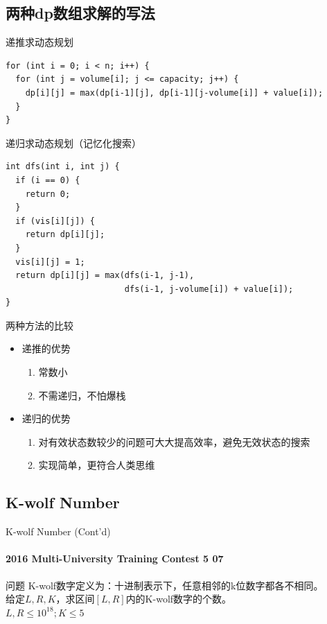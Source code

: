 \documentclass[hyperref={unicode=true}]{beamer}
\theoremstyle{definition}
\theoremstyle{proof}
\begin{document}
\subsection{两种dp数组求解的写法}
\begin{frame}[fragile]{递推求动态规划}
  \begin{verbatim}
for (int i = 0; i < n; i++) {
  for (int j = volume[i]; j <= capacity; j++) {
    dp[i][j] = max(dp[i-1][j], dp[i-1][j-volume[i]] + value[i]);
  }
}
  \end{verbatim}
\end{frame}

\begin{frame}[fragile]{递归求动态规划（记忆化搜索）}
  \begin{verbatim}
int dfs(int i, int j) {
  if (i == 0) {
    return 0;
  }
  if (vis[i][j]) {
    return dp[i][j];
  }
  vis[i][j] = 1;
  return dp[i][j] = max(dfs(i-1, j-1),
                        dfs(i-1, j-volume[i]) + value[i]);
}
  \end{verbatim}
\end{frame}
\begin{frame}{两种方法的比较}
  \begin{itemize}[<+->]
  \item 递推的优势
    \begin{enumerate}
    \item 常数小
    \item 不需递归，不怕爆栈
    \end{enumerate}
  \item 递归的优势
    \begin{enumerate}
    \item 对有效状态数较少的问题可大大提高效率，避免无效状态的搜索
    \item 实现简单，更符合人类思维
    \end{enumerate}
  \end{itemize}
\end{frame}


\subsection{K-wolf Number}
\begin{frame}{K-wolf Number (Cont'd)}\framesubtitle{2016 Multi-University Training Contest 5 07}
  \begin{block}{问题}
    K-wolf数字定义为：十进制表示下，任意相邻的k位数字都各不相同。\\
    给定$L,R,K$，求区间$[L,R]$内的K-wolf数字的个数。\\
    $L,R\leq10^{18};K\leq5$
  \end{block}
\end{frame}
\end{document}
